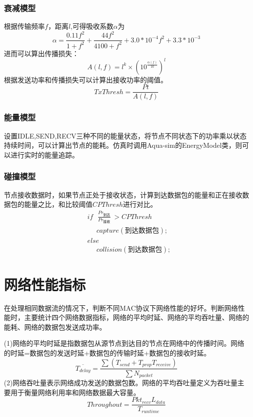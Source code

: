 \subsubsection{衰减模型}
根据传输频率$f$，距离$l$,可得吸收系数$\alpha$为
\begin{equation}
\alpha=\frac{0.11f^2}{1+f^2}+\frac{44f^2}{4100+f^2}+3.0*10^{-4}f^2+3.3*10^{-3}
\end{equation}
进而可以算出传播损失：
\begin{equation}
A(l,f)=l^k\times(10^{\frac{\alpha (f)}{10}})^l
\end{equation}
根据发送功率和传播损失可以计算出接收功率的阈值。
\begin{equation}
TxThresh=\frac{Pt}{A(l,f)}
\end{equation}

\subsubsection{能量模型}
设置IDLE,SEND,RECV三种不同的能量状态，将节点不同状态下的功率乘以状态持续时间，可以计算出节点的能耗。仿真时调用Aqua-sim的EnergyModel类，则可以进行实时的能量追踪。

\subsubsection{碰撞模型}
节点接收数据时，如果节点正处于接收状态，计算到达数据包的能量和正在接收数据包的能量之比，和比较阈值$CPThresh$进行对比。
\begin{equation}
\begin{aligned}
&if \ \ \  \frac{Pr_{\mbox{到达}}}{Pr_{\mbox{接收}}}\  > CPThresh\\
&\ \ \ \ \ \ capture(\mbox{到达数据包});\\
&else\\
&\ \ \ \ \ \ collision(\mbox{到达数据包});
\end{aligned}
\end{equation}

\section{网络性能指标}
在处理相同数据流的情况下，判断不同MAC协议下网络性能的好坏。判断网络性能时，主要统计四个网络数据指标，网络的平均时延、网络的平均吞吐量、网络的能耗、网络的数据包发送成功率。

(1)网络的平均时延是指数据包从源节点到达目的节点在网络中的传播时间。网络的时延=数据包的发送时延+数据包的传输时延+数据包的接收时延。 
\begin{equation}
\overline{T_{delay}}=\frac {\sum (T_{send}+T_{prop}T_{receive})}{\sum {N_{packet}}}
\end{equation}
(2)网络吞吐量表示网络成功发送的数据包数。网络的平均吞吐量定义为吞吐量主要用于衡量网络利用率和网络数据最大容量。
\begin{equation}
Throughout=\frac{Pkt_{recv} L_{data}}{T_{runtime}}
\end{equation}

